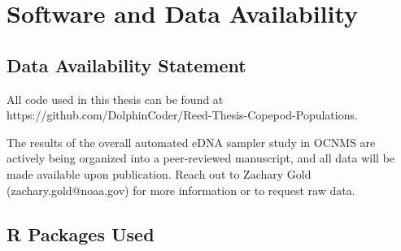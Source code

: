 \documentclass[12pt,twoside]{reedthesis}
\begin{document}
{   	\appendix
   \chapter{Software and Data Availability}\label{chap:appR}
   
   \section{Data Availability Statement}
   
   All code used in this thesis can be found at https://github.com/DolphinCoder/Reed-Thesis-Copepod-Populations.
   
   The results of the overall automated eDNA sampler study in OCNMS are actively being organized into a peer-reviewed manuscript, and all data will be made available upon publication. Reach out to Zachary Gold (zachary.gold@noaa.gov) for more information or to request raw data.
     
     \section{R Packages Used}
	\begin{hangparas}{0.25in}{1}
	    \\
	   
	    \\
	   
	    \\
	   
	    \\
	   
	     \\ 
	   
	    \\
	   
	    \\
	   
	    \\
	   
	    \\
	   
	    \\
	   
	     \\ 
	   
   \end{hangparas}

}
\end{document}
